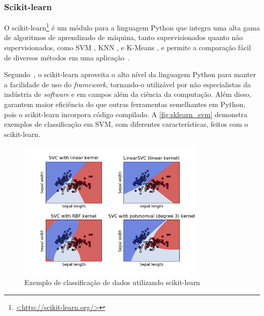 \subsubsection{Scikit-learn}\label{sec:ml_sklearn}

O scikit-learn\footnote{\href{http://scikit-learn.org/}{<http://scikit-learn.org/>}} é um módulo para a linguagem Python que integra uma alta gama de algoritmos de aprendizado de máquina, tanto supervisionados quanto não supervisionados, como SVM \cite{cortes:1995svm}, KNN \cite{cover:1967knn}, e K-Means \cite{macqueen:1967kmeans}, e permite a comparação fácil de diversos métodos em uma aplicação~\cite{pedregosa:2011}.

Segundo~, o scikit-learn aproveita o alto nível da linguagem Python para manter a facilidade de uso do \textit{framework}, tornando-o utilizável por não especialistas da indústria de \textit{software} e em campos além da ciência da computação. Além disso,~ garantem maior eficiência do que outras ferramentas semelhantes em Python, pois o scikit-learn incorpora código compilado. A \autoref{fig:sklearn_svm} demonstra exemplos de classificação em SVM, com diferentes características, feitos com o scikit-learn.

\begin{figure}[ht]
	\caption{\label{fig:sklearn_svm}Exemplo de classificação de dados utilizando scikit-learn}
	\begin{center}
	    \includegraphics[width=0.8\textwidth]{resources/sklearn_iris_svm.png}
	\end{center}
\end{figure}

